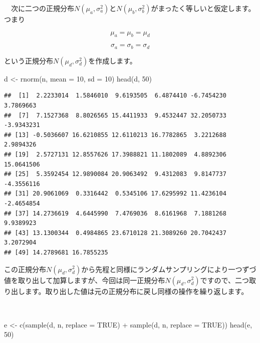 \documentclass[]{tufte-handout}
\newenvironment{Shaded}{}{}
\newcommand{\AttributeTok}[1]{\textcolor[rgb]{0.49,0.56,0.16}{#1}}
\newcommand{\ConstantTok}[1]{\textcolor[rgb]{0.53,0.00,0.00}{#1}}
\newcommand{\DecValTok}[1]{\textcolor[rgb]{0.25,0.63,0.44}{#1}}
\newcommand{\FunctionTok}[1]{\textcolor[rgb]{0.02,0.16,0.49}{#1}}
\newcommand{\NormalTok}[1]{#1}
\newcommand{\OtherTok}[1]{\textcolor[rgb]{0.00,0.44,0.13}{#1}}
\newcommand{\SpecialCharTok}[1]{\textcolor[rgb]{0.25,0.44,0.63}{#1}}
\begin{document}
　次に二つの正規分布\(N(\mu_a, \sigma^2_a)\)と\(N(\mu_b,\sigma^2_b)\)がまったく等しいと仮定します。つまり

\[\mu_a = \mu_b = \mu_d\]

\[\sigma_a = \sigma_b = \sigma_d\]

という正規分布\(N(\mu_d, \sigma^2_d)\)を作成します。

\begin{Shaded}
\begin{Highlighting}[numbers=left,,]
\NormalTok{d }\OtherTok{\textless{}{-}} \FunctionTok{rnorm}\NormalTok{(n, }\AttributeTok{mean =} \DecValTok{10}\NormalTok{, }\AttributeTok{sd =} \DecValTok{10}\NormalTok{)}
\FunctionTok{head}\NormalTok{(d, }\DecValTok{50}\NormalTok{)}
\end{Highlighting}
\end{Shaded}

\begin{verbatim}
##  [1]  2.2233014  1.5846010  9.6193505  6.4874410 -6.7454230  3.7869663
##  [7]  7.1527368  8.8026565 15.4411933  9.4532447 32.2050733 -3.9343231
## [13] -0.5036607 16.6210855 12.6110213 16.7782865  3.2212688  2.9894326
## [19]  2.5727131 12.8557626 17.3988821 11.1802089  4.8892306 15.0641506
## [25]  5.3592454 12.9890084 20.9063492  9.4312083  9.8147737 -4.3556116
## [31] 20.9061069  0.3316442  0.5345106 17.6295992 11.4236104 -2.4654854
## [37] 14.2736619  4.6445990  7.4769036  8.6161968  7.1881268  9.9389923
## [43] 13.1300344  0.4984865 23.6710128 21.3089260 20.7042437  3.2072904
## [49] 14.2789681 16.7855235
\end{verbatim}

この正規分布\(N(\mu_d, \sigma^2_d)\)から先程と同様にランダムサンプリングにより一つずづ値を取り出して加算しますが、今回は同一正規分布\(N(\mu_d, \sigma^2_d)\)ですので、二つ取り出します。取り出した値は元の正規分布に戻し同様の操作を繰り返します。

　

\begin{Shaded}
\begin{Highlighting}[numbers=left,,]
\NormalTok{e }\OtherTok{\textless{}{-}} \FunctionTok{c}\NormalTok{(}\FunctionTok{sample}\NormalTok{(d, n, }\AttributeTok{replace =} \ConstantTok{TRUE}\NormalTok{) }\SpecialCharTok{+} \FunctionTok{sample}\NormalTok{(d, n, }\AttributeTok{replace =} \ConstantTok{TRUE}\NormalTok{))}
\FunctionTok{head}\NormalTok{(e, }\DecValTok{50}\NormalTok{)}
\end{Highlighting}
\end{Shaded}
\end{document}
